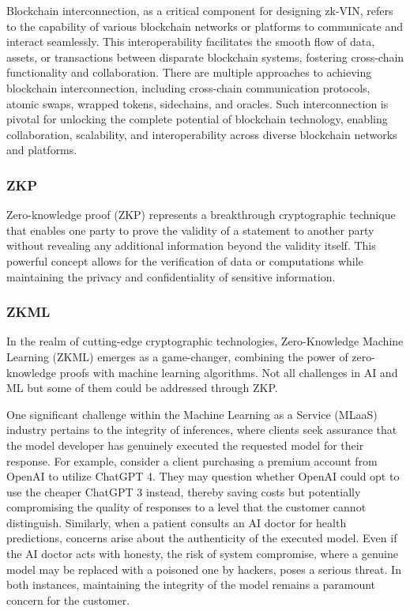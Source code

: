 \documentclass[conference]{IEEEtran}
\begin{document}
Blockchain interconnection, as a critical component for designing zk-VIN, refers to the capability of various blockchain networks or platforms to communicate and interact seamlessly. This interoperability facilitates the smooth flow of data, assets, or transactions between disparate blockchain systems, fostering cross-chain functionality and collaboration. There are multiple approaches to achieving blockchain interconnection, including cross-chain communication protocols, atomic swaps, wrapped tokens, sidechains, and oracles. Such interconnection is pivotal for unlocking the complete potential of blockchain technology, enabling collaboration, scalability, and interoperability across diverse blockchain networks and platforms.

\subsubsection{ZKP}

Zero-knowledge proof (ZKP) represents a breakthrough cryptographic technique that enables one party to prove the validity of a statement to another party without revealing any additional information beyond the validity itself. This powerful concept allows for the verification of data or computations while maintaining the privacy and confidentiality of sensitive information.

\subsubsection{ZKML}

In the realm of cutting-edge cryptographic technologies, Zero-Knowledge Machine Learning (ZKML) emerges as a game-changer, combining the power of zero-knowledge proofs with machine learning algorithms. Not all challenges in AI and ML but some of them could be addressed through ZKP.

One significant challenge within the Machine Learning as a Service (MLaaS) industry pertains to the integrity of inferences, where clients seek assurance that the model developer has genuinely executed the requested model for their response. For example, consider a client purchasing a premium account from OpenAI to utilize ChatGPT 4. They may question whether OpenAI could opt to use the cheaper ChatGPT 3 instead, thereby saving costs but potentially compromising the quality of responses to a level that the customer cannot distinguish. Similarly, when a patient consults an AI doctor for health predictions, concerns arise about the authenticity of the executed model. Even if the AI doctor acts with honesty, the risk of system compromise, where a genuine model may be replaced with a poisoned one by hackers, poses a serious threat. In both instances, maintaining the integrity of the model remains a paramount concern for the customer.
\end{document}
